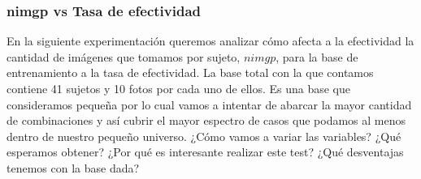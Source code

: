 \subsubsection{nimgp vs Tasa de efectividad}
En la siguiente experimentación queremos analizar cómo afecta a la efectividad la cantidad de imágenes que tomamos por sujeto, $nimgp$, para la base
de entrenamiento a la tasa de efectividad. La base total con la que contamos contiene 41 sujetos y 10 fotos por cada uno de ellos. Es una base que
consideramos pequeña por lo cual vamos a intentar de abarcar la mayor cantidad de combinaciones y así cubrir el mayor espectro de casos que podamos
al menos dentro de nuestro pequeño universo.
¿Cómo vamos a variar las variables?
¿Qué esperamos obtener?
¿Por qué es interesante realizar este test?
¿Qué desventajas tenemos con la base dada?